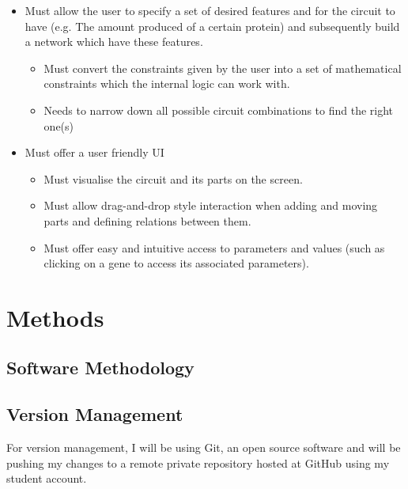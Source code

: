 \documentclass{article}
\begin{document}
\begin{itemize}
		\item Must allow the user to specify a set of desired  features and for the circuit to have (e.g. The amount produced of a certain protein) and subsequently build a network which have these features.
		\begin{itemize}
			\item Must convert the constraints given by the user into a set of mathematical constraints which the internal logic can work with.
			\item Needs to narrow down all possible circuit combinations to find the right one(s) 
		\end{itemize}
	
		\item Must offer a user friendly UI 
		\begin{itemize}
			\item Must visualise the circuit and its parts on the screen.
			\item Must allow drag-and-drop style interaction when adding and moving parts and defining relations between them.
			\item Must offer easy and intuitive access to parameters and values (such as clicking on a gene to access its associated parameters).
		\end{itemize}
	
		\end{itemize}
	
	\section{Methods}
	
	\subsection{Software Methodology}
		
	\subsection{Version Management}
	\par For version management, I will be using Git, an open source software and will be pushing my changes to a remote private repository hosted at GitHub using my student account.
	
\end{document}
